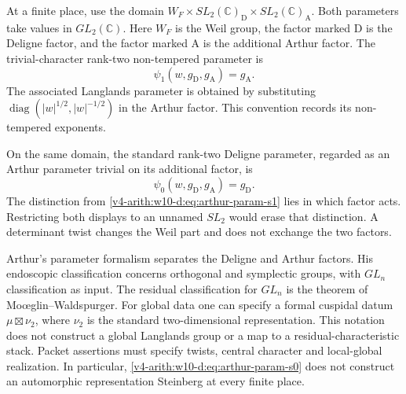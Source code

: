 \begin{definition}
\label{v4-arith:w10-d:def:arthur-param-s1}
At a finite place, use the domain
$W_F\times SL_2(\mathbb C)_{\mathrm D}\times SL_2(\mathbb C)_{\mathrm A}$.
Both parameters take values in $GL_2(\mathbb C)$.
Here $W_F$ is the Weil group, the factor marked $\mathrm D$ is the
Deligne factor, and the factor marked $\mathrm A$ is the additional
Arthur factor. The trivial-character rank-two non-tempered parameter is
\begin{equation}\label{v4-arith:w10-d:eq:arthur-param-s1}
 \psi_1(w,g_{\mathrm D},g_{\mathrm A})=g_{\mathrm A}.
\end{equation}
The associated Langlands parameter is obtained by substituting
$\operatorname{diag}(|w|^{1/2},|w|^{-1/2})$ in the Arthur factor.
This convention records its non-tempered exponents.
\end{definition}

\begin{definition}
\label{v4-arith:w10-d:def:arthur-param-s0}
On the same domain, the standard rank-two Deligne parameter, regarded
as an Arthur parameter trivial on its additional factor, is
\begin{equation}\label{v4-arith:w10-d:eq:arthur-param-s0}
 \psi_0(w,g_{\mathrm D},g_{\mathrm A})=g_{\mathrm D}.
\end{equation}
The distinction from \eqref{v4-arith:w10-d:eq:arthur-param-s1} lies in
which factor acts. Restricting both displays to an unnamed $SL_2$
would erase that distinction. A determinant twist changes the Weil
part and does not exchange the two factors.
\end{definition}

\begin{remark}
\label{v4-arith:w10-d:rem:arthur-gln}
Arthur's parameter formalism separates the Deligne and Arthur factors.
His endoscopic classification concerns orthogonal and symplectic groups,
with $GL_n$ classification as input. The residual classification for
$GL_n$ is the theorem of Mo{\oe}glin--Waldspurger.
For global data one can specify a formal cuspidal datum
$\mu\boxtimes\nu_2$, where $\nu_2$ is the standard two-dimensional
representation. This notation does not construct a global Langlands
group or a map to a residual-characteristic stack. Packet assertions
must specify twists, central character and local-global realization.
In particular, \eqref{v4-arith:w10-d:eq:arthur-param-s0} does not
construct an automorphic representation Steinberg at every finite place.
\end{remark}

